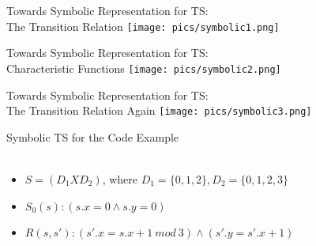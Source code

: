 \documentclass{beamer}
\begin{document}
\begin{frame}{Towards Symbolic Representation for TS:\\The Transition Relation}
\texttt{[image: pics/symbolic1.png]}
\end{frame}

\begin{frame}{Towards Symbolic Representation for TS:\\Characteristic Functions}
\texttt{[image: pics/symbolic2.png]}
\end{frame}

\begin{frame}{Towards Symbolic Representation for TS:\\The Transition Relation Again}
\texttt{[image: pics/symbolic3.png]}
\end{frame}

\begin{frame}{Symbolic TS for the Code Example}
\hfill
{} \\
 \\
\begin{itemize}
\item<3-> $S = (D_1 X D_2)$, where $D_1 = \{0,1,2\}, D_2 = \{0,1,2,3\}$
\item<3-> $S_0(s): (s.x = 0 \land s.y =0)$
\item<3-> $R(s,s'): (s'.x = s.x+1~mod~3) \land (s'.y = s'.x + 1) $
\end{itemize}
\end{frame}
\end{document}
